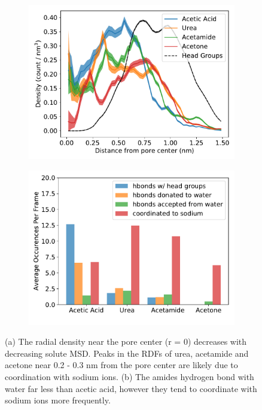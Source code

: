 \documentclass{article}
\begin{document}
  \begin{figure}[!htb]
  \centering
  \begin{subfigure}{0.45\textwidth}
  \includegraphics[width=\textwidth]{ketone_rdf.pdf}
  \caption{}\label{fig:ketones_rdf}
  \end{subfigure}
  \begin{subfigure}{0.45\textwidth}
  \includegraphics[width=\textwidth]{ketone_hbonds.pdf}
  \caption{}\label{fig:ketone_hbonds}
  \end{subfigure}
  \caption{(a) The radial density near the pore center (r = 0) decreases
  with decreasing solute MSD. Peaks in the RDFs of urea, acetamide and
  acetone near 0.2 - 0.3 nm from the pore center are likely due to coordination
  with sodium ions. (b) The amides hydrogen bond with water far less than 
  acetic acid, however they tend to coordinate with sodium ions more 
  frequently.}\label{fig:ketones}
  \end{figure}
  
\end{document}
